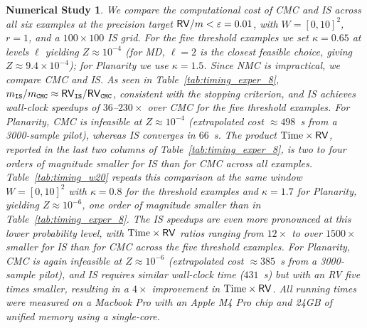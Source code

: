 \documentclass[pdflatex, sn-mathphys-ay]{sn-jnl}%
\newtheorem{experiment}{Numerical Study}
\theoremstyle{thmstyleone}%
\theoremstyle{thmstyletwo}%
\theoremstyle{thmstylethree}%
\begin{document}
\begin{experiment}
 
\label{exper-8}
\normalfont
We compare the computational cost of CMC and IS across all six examples at the precision target ${\sf RV}/m < \varepsilon = 0.01$, with $W = [0,10]^2$, $r = 1$, and a $100 \times 100$ IS grid. For the five threshold examples we set $\kappa = 0.65$ at levels $\ell$ yielding $Z \approx 10^{-4}$ (for MD, $\ell = 2$ is the closest feasible choice, giving $Z \approx 9.4 \times 10^{-4}$); for Planarity we use $\kappa = 1.5$. Since NMC is impractical, we compare CMC and IS. As seen in Table~\ref{tab:timing_exper_8}, $m_{\tt IS}/m_{\tt CMC} \approx {\sf RV}_{\tt IS}/{\sf RV}_{\tt CMC}$, consistent with the stopping criterion, and IS achieves wall-clock speedups of $36$--$230\times$ over CMC for the five threshold examples. For Planarity, CMC is infeasible at $Z \approx 10^{-4}$ (extrapolated cost $\approx 498$~s from a 3000-sample pilot), whereas IS converges in $66$~s. The product $\text{Time} \times {\sf RV}$, reported in the last two columns of Table~\ref{tab:timing_exper_8}, is two to four orders of magnitude smaller for IS than for CMC across all examples. Table~\ref{tab:timing_w20} repeats this comparison at the same window $W = [0,10]^2$ with $\kappa = 0.8$ for the threshold examples and $\kappa = 1.7$ for Planarity, yielding $Z \approx 10^{-6}$, one order of magnitude smaller than in Table~\ref{tab:timing_exper_8}. The IS speedups are even more pronounced at this lower probability level, with $\text{Time} \times {\sf RV}$ ratios ranging from $12\times$ to over $1500\times$ smaller for IS than for CMC across the five threshold examples. For Planarity, CMC is again infeasible at $Z \approx 10^{-6}$ (extrapolated cost $\approx 385$~s from a 3000-sample pilot), and IS requires similar wall-clock time ($431$~s) but with an RV five times smaller, resulting in a $4\times$ improvement in $\text{Time} \times {\sf RV}$. All running times were measured on a Macbook Pro with an Apple M4 Pro chip and 24GB of unified memory using a single-core. 
\end{experiment}
\end{document}
